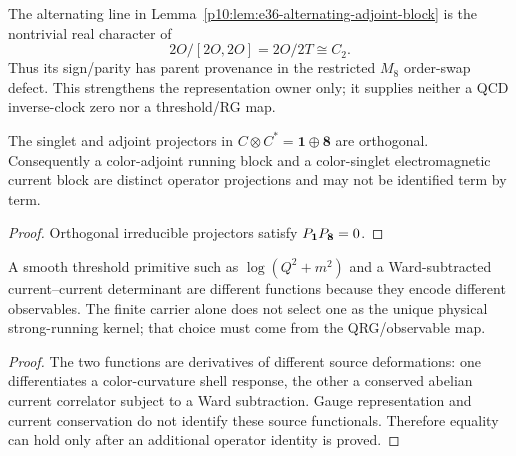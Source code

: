 \documentclass[12pt,a4paper]{article}
\begin{document}
\begin{corollary}
\label{p10:cor:v188-alternating-defect-provenance}
The alternating line in Lemma~\ref{p10:lem:e36-alternating-adjoint-block} is
the nontrivial real character of
\[
 2O/[2O,2O]=2O/2T\cong C_2.
\]
Thus its sign/parity has parent provenance in the restricted $M_8$ order-swap
defect.  This strengthens the representation owner only; it supplies neither
a QCD inverse-clock zero nor a threshold/RG map.
\end{corollary}

\begin{lemma}
\label{p10:lem:color-singlet-running-no-double-counting}
The singlet and adjoint projectors in \(C\otimes C^*=\mathbf1\oplus\mathbf8\) are orthogonal.  Consequently a color-adjoint running block and a color-singlet electromagnetic current block are distinct operator projections and may not be identified term by term.
\end{lemma}
\begin{proof}
Orthogonal irreducible projectors satisfy \(P_{\bf1}P_{\bf8}=0\).
\end{proof}

\begin{lemma}
\label{p10:lem:native-shell-vs-ward-current-determinant}
A smooth threshold primitive such as \(\log(Q^2+m^2)\) and a Ward-subtracted current--current determinant are different functions because they encode different observables.  The finite carrier alone does not select one as the unique physical strong-running kernel; that choice must come from the QRG/observable map.
\end{lemma}
\begin{proof}
The two functions are derivatives of different source deformations: one differentiates a color-curvature shell response, the other a conserved abelian current correlator subject to a Ward subtraction.  Gauge representation and current conservation do not identify these source functionals.  Therefore equality can hold only after an additional operator identity is proved.
\end{proof}
\end{document}

